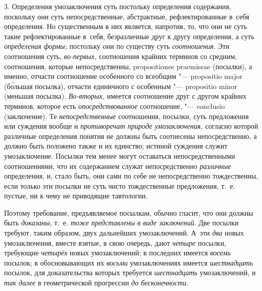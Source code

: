 3. Определения умозаключения суть постольку определения
содержания, поскольку они суть непосредственные, абстрактные,
рефлектированные в~себя определения. Но существенным в них является,
напротив, то, что они не суть такие рефлектированные в~себя, безразличные
друг к другу определения, а суть
{\em определения формы;}
постольку они по существу суть
{\em соотношения}. Эти
соотношения суть, {\em во-первых,}
соотношения крайних терминов со средним, соотношения, которые
непосредственны, proposi\-tiones prae\-missae (посылки), а
именно, отчасти соотношение особенного со всеобщим "--- propositio major
(б\'{о}льшая посылка), отчасти единичного с особенным "---
propositio minor (меньшая посылка).
{\em Во-вторых,} имеется
соотношение друг с другом крайних терминов, которое есть
{\em опосредствованное}
соотношение, "--- conclusio (заключение). Те
{\em непосредственные}
соотношения, посылки, суть предложения или суждения вообще и
{\em противоречат природе
умозаключения,} согласно которой различные определения
понятия не должны быть соотнесены непосредственно, а должно быть положено
также и их единство; истиной суждения служит умозаключение. Посылки тем
менее могут оставаться непосредственными соотношениями, что их содержанием
служат непосредственно {\em различные}
определения, и, стало быть, они сами по себе не
непосредственно тождественны, если только эти посылки не суть чисто
тождественные предложения, т.~е. пустые, ни к чему не приводящие
тавтологии.

Поэтому требование, предъявляемое посылкам, обычно гласит, что
они должны быть {\em доказаны,}
т.~е. {\em тоже
представлены в виде заключений}. Две посылки требуют, таким
образом, двух дальнейших умозаключений. А~эти
{\em два} новых
умозаключения, вместе взятые, в свою очередь, дают
{\em четыре} посылки,
требующие {\em четырёх}
новых умозаключений; в последних имеется
{\em восемь} посылок; в
обосновывающих их {\em восьми}
умозаключениях имеется
{\em шестнадцать}
посылок, для доказательства которых требуется
{\em шестнадцать}
умозаключений, и {\em так
далее} в геометрической прогрессии
{\em до бесконечности}.

